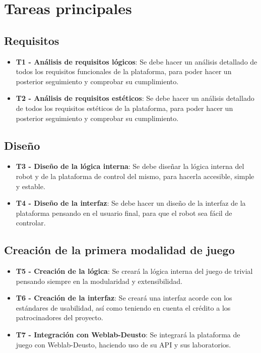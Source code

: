 \section{Tareas principales}

\subsection{Requisitos}

\begin{itemize}
\item \textbf{T1 - Análisis de requisitos lógicos}: Se debe hacer un análisis detallado de todos los
requisitos funcionales de la plataforma, para poder hacer un posterior seguimiento y comprobar su
cumplimiento.

\item \textbf{T2 - Análisis de requisitos estéticos}: Se debe hacer un análisis detallado de todos
los requisitos estéticos de la plataforma, para poder hacer un posterior seguimiento y comprobar su
cumplimiento.
\end{itemize}

\subsection{Diseño}

\begin{itemize}
\item \textbf{T3 - Diseño de la lógica interna}: Se debe diseñar la lógica interna del robot y de la
plataforma de control del mismo, para hacerla accesible, simple y estable.

\item \textbf{T4 - Diseño de la interfaz}: Se debe hacer un diseño de la interfaz de la plataforma
pensando en el usuario final, para que el robot sea fácil de controlar.
\end{itemize}

\subsection{Creación de la primera modalidad de juego}

\begin{itemize}
\item \textbf{T5 - Creación de la lógica}: Se creará la lógica interna del juego de trivial pensando
siempre en la modularidad y extensibilidad.

\item \textbf{T6 - Creación de la interfaz}: Se creará una interfaz acorde con los estándares de
usabilidad, así como teniendo en cuenta el crédito a los patrocinadores del proyecto.

\item \textbf{T7 - Integración con Weblab-Deusto}: Se integrará la plataforma de juego con
Weblab-Deusto, haciendo uso de su API y sus laboratorios.
\end{itemize}

